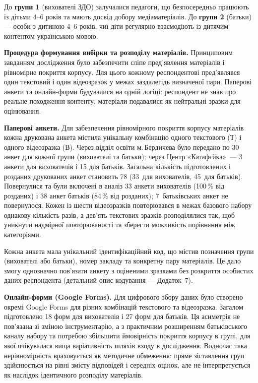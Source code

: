 \documentclass[14pt, a4paper]{extreport}
\begin{document}
До \textbf{групи 1} (вихователі ЗДО) залучалися педагоги, що безпосередньо працюють із дітьми 4--6 років та мають досвід добору медіаматеріалів. До \textbf{групи 2} (батьки) --- особи з дитиною 4--6 років, чиї діти регулярно взаємодіють із дитячим контентом українською мовою.

\textbf{Процедура формування вибірки та розподілу матеріалів.}
Принциповим завданням дослідження було забезпечити сліпе пред'явлення матеріалів і рівномірне покриття корпусу. Для цього кожному респондентові пред'являвся один текстовий і один відеозразок у межах заздалегідь визначеної пари. Паперові анкети та онлайн-форми будувалися на одній логіці: респондент не знав про реальне походження контенту, матеріали подавалися як нейтральні зразки для оцінювання.

\textbf{Паперові анкети.} Для забезпечення рівномірного покриття корпусу матеріалів кожна друкована анкета містила унікальну комбінацію одного текстового (Т) і одного відеозразка (В). Через відділ освіти м.\,Бердичева було передано по 30 анкет для кожної групи (вихователі та батьки); через Центр «Катафєйка»~--- 3 анкети для вихователів і 15 для батьків. Загальна кількість підготовлених і розданих друкованих анкет становить 78 (33~для вихователів, 45~для батьків). Повернулися та були включені в аналіз 33 анкети вихователів (100\,\% від розданих) і 38 анкет батьків (84\,\% від розданих); 7~батьківських анкет не повернулося. Кожен із шести відеозразків повторювався в межах базового набору однакову кількість разів, а дев'ять текстових зразків розподілялися так, щоб уникнути надмірної повторюваності та зберегти можливість порівняння між категоріями.

Кожна анкета мала унікальний ідентифікаційний код, що містив позначення групи (вихователі або батьки), номер закладу та конкретну пару матеріалів. Це дало змогу однозначно пов'язати анкету з оціненими зразками без розкриття особистих даних респондента (детальний опис кодування --- Додаток~7).

\textbf{Онлайн-форми (Google Forms).} Для цифрового збору даних було створено окремі Google Forms для різних комбінацій текстового та відеозразка. Загалом підготовлено 18 форм для вихователів і 27 форм для батьків. Ця асиметрія не пов'язана зі зміною інструментарію, а з практичним розширенням батьківського каналу набору та потребою збільшити ймовірність покриття корпусу в групі, для якої очікувалася вища варіативність шляхів входу в дослідження. Водночас така нерівномірність враховується як методичне обмеження: пряме зіставлення груп здійснюється на рівні змісту відповідей і середніх оцінок, але не інтерпретується як наслідок ідентичного розподілу матеріалів.
\end{document}
